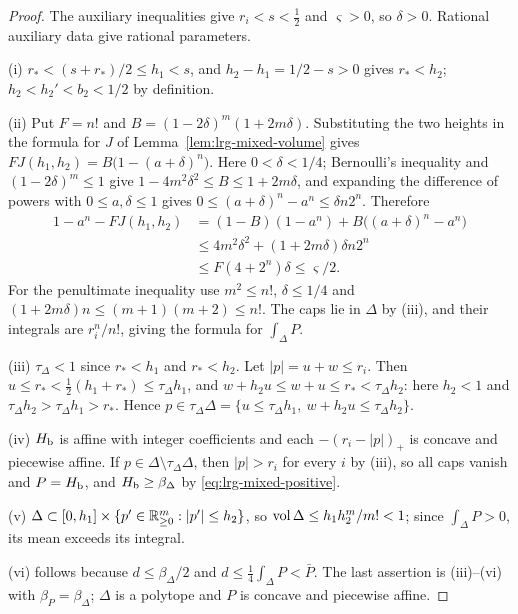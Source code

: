 \begin{proof}
The auxiliary inequalities give $r_i<s<\frac12$ and $\varsigma>0$, so $\delta>0$. Rational auxiliary data give rational parameters.

(i) $r_*<(s+r_*)/2\le h_1<s$, and $h_2-h_1=1/2-s>0$ gives $r_*<h_2$; $h_2<h_2'<b_2<1/2$ by definition.

(ii) Put $F=n!$ and $B=(1-2\delta)^m(1+2m\delta)$. Substituting the two heights in the formula for $J$ of
Lemma~\ref{lem:lrg-mixed-volume} gives $FJ(h_1,h_2)=B\bigl(1-(a+\delta)^n\bigr)$. Here $0<\delta<1/4$; Bernoulli's
inequality and $(1-2\delta)^m\le1$ give $1-4m^2\delta^2\le B\le1+2m\delta$, and expanding the difference of powers
with $0\le a,\delta\le1$ gives $0\le(a+\delta)^n-a^n\le\delta n2^n$. Therefore
\begin{align*}
 1-a^n-FJ(h_1,h_2)
 &=(1-B)(1-a^n)+B\bigl((a+\delta)^n-a^n\bigr)\\
 &\le4m^2\delta^2+(1+2m\delta)\delta n2^n\\
 &\le F(4+2^n)\delta\le\varsigma/2.
\end{align*}
For the penultimate inequality use $m^2\le n!$, $\delta\le1/4$ and $(1+2m\delta)n\le(m+1)(m+2)\le n!$. The caps lie
in $\Delta$ by (iii), and their integrals are $r_i^n/n!$, giving the formula for $\int_\Delta P$.

(iii) $\tau_\Delta<1$ since $r_*<h_1$ and $r_*<h_2$. Let $|p|=u+w\le r_i$. Then $u\le r_*<\frac12(h_1+r_*)\le\tau_\Delta h_1$,
and $w+h_2u\le w+u\le r_*<\tau_\Delta h_2$: here $h_2<1$ and $\tau_\Delta h_2>\tau_\Delta h_1>r_*$. Hence $p\in\tau_\Delta\Delta=\{u\le\tau_\Delta h_1,\ w+h_2u\le\tau_\Delta h_2\}$.

(iv) $H_{\mathrm b}$ is affine with integer coefficients and each $-(r_i-|p|)_+$ is concave and piecewise affine. If
$p\in\Delta\setminus\tau_\Delta\Delta$, then $|p|>r_i$ for every $i$ by (iii), so all caps vanish and $P=H_{\mathrm b}$, and
$H_{\mathrm b}\ge\beta_\Delta$ by \eqref{eq:lrg-mixed-positive}.

(v) $\Delta\subset[0,h_1]\times\{p'\in\mathbb{R}^m_{\ge0}:|p'|\le h_2\}$, so $\operatorname{vol}\Delta\le h_1h_2^m/m!<1$; since $\int_\Delta P>0$, its mean
exceeds its integral.

(vi) follows because $d\le\beta_\Delta/2$ and $d\le\frac14\int_\Delta P<\bar P$. The last assertion is (iii)--(vi) with $\beta_P=\beta_\Delta$; $\Delta$ is a polytope and
$P$ is concave and piecewise affine.
\end{proof}

